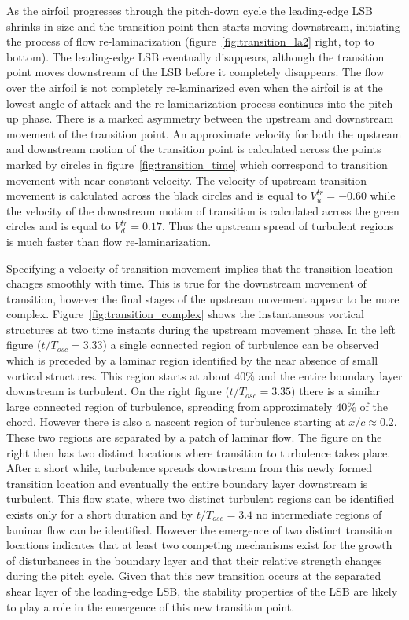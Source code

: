 As the airfoil progresses through the pitch-down cycle the leading-edge LSB shrinks in size and the transition point then starts moving downstream, initiating the process of flow re-laminarization (figure~\ref{fig:transition_la2} right, top to bottom). The leading-edge LSB eventually disappears, although the transition point moves downstream of the LSB before it completely disappears. The flow over the airfoil is not completely re-laminarized even when the airfoil is at the lowest angle of attack and the re-laminarization process continues into the pitch-up phase. There is a marked asymmetry between the upstream and downstream movement of the transition point. An approximate velocity for both the upstream and downstream motion of the transition point is calculated across the points marked by circles in figure~\ref{fig:transition_time} which correspond to transition movement with near constant velocity. The velocity of upstream transition movement is calculated across the black circles and is equal to $V^{tr}_{u}=-0.60$ while the velocity of the downstream motion of transition is calculated across the green circles and is equal to $V^{tr}_{d}=0.17$. Thus the upstream spread of turbulent regions is much faster than flow re-laminarization. %

Specifying a velocity of transition movement implies that the transition location changes smoothly with time. This is true for the downstream movement of transition, however the final stages of the upstream movement appear to be more complex. Figure~\ref{fig:transition_complex} shows the instantaneous vortical structures at two time instants during the upstream movement phase. In the left figure ($t/T_{osc}=3.33$) a single connected region of turbulence can be observed which is preceded by a laminar region identified by the near absence of small vortical structures. This region starts at about $40\%$ and the entire boundary layer downstream is turbulent. On the right figure ($t/T_{osc}=3.35$) there is a similar large connected region of turbulence, spreading from approximately $40\%$ of the chord. However there is also a nascent region of turbulence starting at $x/c\approx0.2$. These two regions are separated by a patch of laminar flow. The figure on the right then has two distinct locations where transition to turbulence takes place. After a short while, turbulence spreads downstream from this newly formed transition location and eventually the entire boundary layer downstream is turbulent. This flow state, where two distinct turbulent regions can be identified exists only for a short duration and by $t/T_{osc}=3.4$ no intermediate regions of laminar flow can be identified. However the emergence of two distinct transition locations indicates that at least two competing mechanisms exist for the growth of disturbances in the boundary layer and that their relative strength changes during the pitch cycle. Given that this new transition occurs at the separated shear layer of the leading-edge LSB, the stability properties of the LSB are likely to play a role in the emergence of this new transition point. 

